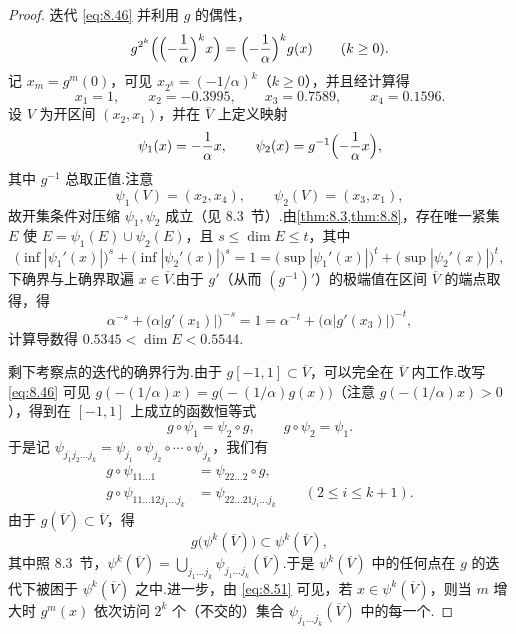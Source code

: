 \begin{proof}
迭代 \eqref{eq:8.46} 并利用 $g$ 的偶性，
\begin{equation}\label{eq:8.48}
  g^{2^{k}}\Bigl(\Bigl(-\frac{1}{\alpha}\Bigr)^{k}x\Bigr)=\Bigl(-\frac{1}{\alpha}\Bigr)^{k}g(x)\qquad(k\geq 0).
\end{equation}
记 $x_m=g^m(0)$，可见 $x_{2^k}=(-1/\alpha)^k$（$k\geq 0$），并且经计算得
\[
  x_1=1,\qquad x_2=-0.3995,\qquad x_3=0.7589,\qquad x_4=0.1596.
\]
设 $V$ 为开区间 $(x_2,x_1)$，并在 $\overline{V}$ 上定义映射
\begin{equation}\label{eq:8.49}
  \psi_1(x)=-\frac{1}{\alpha}x,\qquad \psi_2(x)=g^{-1}\Bigl(-\frac{1}{\alpha}x\Bigr),
\end{equation}
其中 $g^{-1}$ 总取正值.注意
\[
  \psi_1(V)=(x_2,x_4),\qquad \psi_2(V)=(x_3,x_1),
\]
故开集条件对压缩 $\psi_1,\psi_2$ 成立（见 8.3~节）.由\cref{thm:8.3,thm:8.8}，存在唯一紧集 $E$ 使 $E=\psi_1(E)\cup\psi_2(E)$，且 $s\leq\dim E\leq t$，其中
\[
  \bigl(\inf|\psi_1'(x)|\bigr)^{s}+\bigl(\inf|\psi_2'(x)|\bigr)^{s}
  =1=\bigl(\sup|\psi_1'(x)|\bigr)^{t}+\bigl(\sup|\psi_2'(x)|\bigr)^{t},
\]
下确界与上确界取遍 $x\in\overline{V}$.由于 $g'$（从而 $(g^{-1})'$）的极端值在区间 $\overline{V}$ 的端点取得，得
\[
  \alpha^{-s}+\bigl(\alpha|g'(x_1)|\bigr)^{-s}=1=\alpha^{-t}+\bigl(\alpha|g'(x_3)|\bigr)^{-t},
\]
计算导数得 $0.5345<\dim E<0.5544$.

剩下考察点的迭代的确界行为.由于 $g[-1,1]\subset\overline{V}$，可以完全在 $\overline{V}$ 内工作.改写 \eqref{eq:8.46} 可见 $g(-(1/\alpha)x)=g\bigl(-(1/\alpha)g(x)\bigr)$（注意 $g(-(1/\alpha)x)>0$），得到在 $[-1,1]$ 上成立的函数恒等式
\begin{equation}\label{eq:8.50}
  g\circ\psi_1=\psi_2\circ g,\qquad g\circ\psi_2=\psi_1.
\end{equation}
于是记 $\psi_{j_1j_2\ldots j_k}=\psi_{j_1}\circ\psi_{j_2}\circ\cdots\circ\psi_{j_k}$，我们有
\begin{equation}\label{eq:8.51}
  \begin{aligned}
    g\circ\psi_{11\ldots1}&=\psi_{22\ldots2}\circ g,\\
    g\circ\psi_{11\ldots12j_1\ldots j_k}&=\psi_{22\ldots21j_i\ldots j_k}\qquad(2\leq i\leq k+1).
  \end{aligned}
\end{equation}
由于 $g(\overline{V})\subset\overline{V}$，得
\begin{equation}\label{eq:8.52}
  g\bigl(\psi^{k}(\overline{V})\bigr)\subset\psi^{k}(\overline{V}),
\end{equation}
其中照 8.3~节，$\psi^k(\overline{V})=\bigcup_{j_1\ldots j_k}\psi_{j_1\ldots j_k}(\overline{V})$.于是 $\psi^k(\overline{V})$ 中的任何点在 $g$ 的迭代下被困于 $\psi^k(\overline{V})$ 之中.进一步，由 \eqref{eq:8.51} 可见，若 $x\in\psi^k(\overline{V})$，则当 $m$ 增大时 $g^m(x)$ 依次访问 $2^k$ 个（不交的）集合 $\psi_{j_1\ldots j_k}(\overline{V})$ 中的每一个.


\end{proof}
